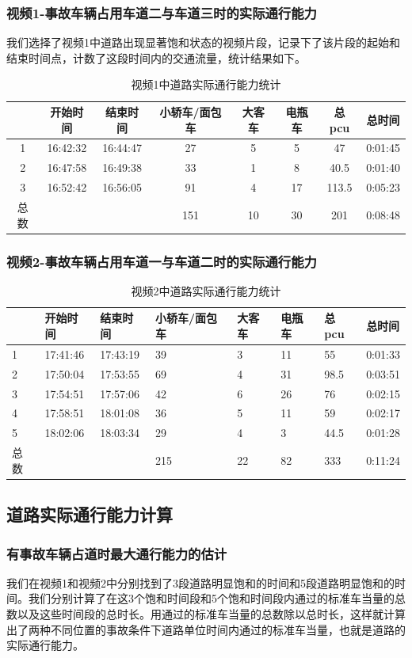 \documentclass{cumcmart}
\begin{document}
\subsubsection{视频1-事故车辆占用车道二与车道三时的实际通行能力}
我们选择了视频1中道路出现显著饱和状态的视频片段，记录下了该片段的起始和结束时间点，计数了这段时间内的交通流量，统计结果如下。
\begin{table}[h]
\centering
\begin{tabular}{|c|c|c|c|c|c|c|c|}
\hline
&开始时间&结束时间&小轿车/面包车&大客车&电瓶车&总pcu&总时间 \\
\hline
1&16:42:32&16:44:47&27&5&5&47&0:01:45 \\
\hline
2&16:47:58&16:49:38&33&1&8&40.5&0:01:40 \\
\hline
3&16:52:42&16:56:05&91&4&17&113.5&0:05:23 \\
\hline
总数&&&151&10&30&201&0:08:48 \\
\hline
\end{tabular}
\label{tab3}
\caption{视频1中道路实际通行能力统计}
\end{table}
\subsubsection{视频2-事故车辆占用车道一与车道二时的实际通行能力}
\begin{table}[h]
\centering
\begin{tabular}{|p{33pt}|l|l|l|l|l|l|l|}
\hline
&开始时间&结束时间&小轿车/面包车&大客车&电瓶车&总pcu&总时间 \\
\hline
1&17:41:46&17:43:19&39&3&11&55&0:01:33 \\
\hline
2&17:50:04&17:53:55&69&4&31&98.5&0:03:51 \\
\hline
3&17:54:51&17:57:06&42&6&26&76&0:02:15 \\
\hline
4&17:58:51&18:01:08&36&5&11&59&0:02:17 \\
\hline
5&18:02:06&18:03:34&29&4&3&44.5&0:01:28 \\
\hline
总数&&&215&22&82&333&0:11:24 \\
\hline
\end{tabular}
\caption{视频2中道路实际通行能力统计}
\end{table}
\subsection{道路实际通行能力计算}
\subsubsection{有事故车辆占道时最大通行能力的估计}
我们在视频1和视频2中分别找到了3段道路明显饱和的时间和5段道路明显饱和的时间。我们分别计算了在这3个饱和时间段和5个饱和时间段内通过的标准车当量的总数以及这些时间段的总时长。用通过的标准车当量的总数除以总时长，这样就计算出了两种不同位置的事故条件下道路单位时间内通过的标准车当量，也就是道路的实际通行能力。
\end{document}
